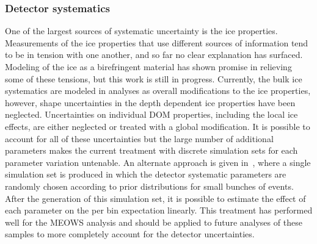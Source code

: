 \subsubsection{Detector systematics}
One of the largest sources of systematic uncertainty is the ice properties.
Measurements of the ice properties that use different sources of information tend to be in tension with one another, and so far no clear explanation has surfaced.
Modeling of the ice as a birefringent material has shown promise in relieving some of these tensions, but this work is still in progress.
Currently, the bulk ice systematics are modeled in analyses as overall modifications to the ice properties, however, shape uncertainties in the depth dependent ice properties have been neglected.
Uncertainties on individual DOM properties, including the local ice effects, are either neglected or treated with a global modification.
It is possible to account for all of these uncertainties but the large number of additional parameters makes the current treatment with discrete simulation sets for each parameter variation untenable.
An alternate approach is given in~\cite{Aartsen:2019jcj}, where a single simulation set is produced in which the detector systematic parameters are randomly chosen according to prior distributions for small bunches of events.
After the generation of this simulation set, it is possible to estimate the effect of each parameter on the per bin expectation linearly.
This treatment has performed well for the MEOWS analysis and should be applied to future analyses of these samples to more completely account for the detector uncertainties.